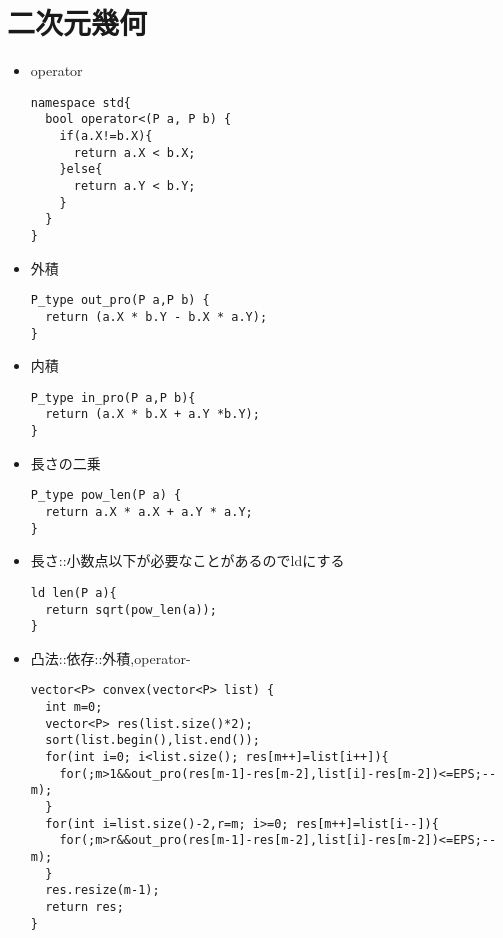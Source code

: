 \documentclass{jsarticle}
\begin{document}
\section{二次元幾何}
  \begin{itemize}
\begin{lstlisting}
typedef long double ld;
typedef long long ll;
typedef ld P_type;
typedef complex<P_type> P;

const ld INF = 1e39;
const ld EPS = 1e-8;
const ld  PI = acos(-1);
\end{lstlisting}
\item operator
\begin{lstlisting}
namespace std{
  bool operator<(P a, P b) {
    if(a.X!=b.X){
      return a.X < b.X;
    }else{
      return a.Y < b.Y;
    }
  }
}
\end{lstlisting}
\item 外積
\begin{lstlisting}
P_type out_pro(P a,P b) {
  return (a.X * b.Y - b.X * a.Y);
}
\end{lstlisting}
\item 内積
\begin{lstlisting}
P_type in_pro(P a,P b){
  return (a.X * b.X + a.Y *b.Y);
}
\end{lstlisting}

\item 長さの二乗
\begin{lstlisting}
P_type pow_len(P a) {
  return a.X * a.X + a.Y * a.Y;
}
\end{lstlisting}
\item 長さ::小数点以下が必要なことがあるのでldにする
\begin{lstlisting}
ld len(P a){
  return sqrt(pow_len(a));
}
\end{lstlisting}
\item 凸法::依存::外積,operator-
\begin{lstlisting}
vector<P> convex(vector<P> list) {
  int m=0;
  vector<P> res(list.size()*2);
  sort(list.begin(),list.end());
  for(int i=0; i<list.size(); res[m++]=list[i++]){
    for(;m>1&&out_pro(res[m-1]-res[m-2],list[i]-res[m-2])<=EPS;--m);
  }
  for(int i=list.size()-2,r=m; i>=0; res[m++]=list[i--]){
    for(;m>r&&out_pro(res[m-1]-res[m-2],list[i]-res[m-2])<=EPS;--m);
  }
  res.resize(m-1);
  return res;
}
\end{lstlisting}

\clearpage

\end{itemize}
\end{document}
